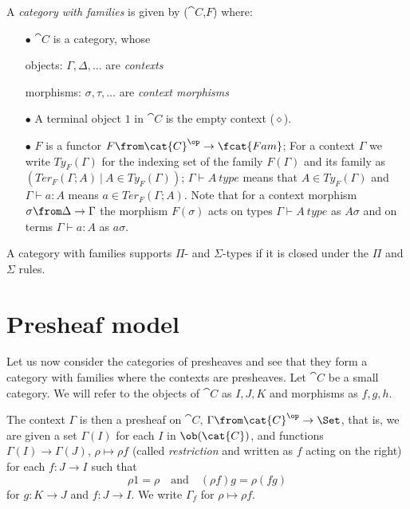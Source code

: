 \begin{definition}
A \emph{category with families} is given by ($\cat{C}$,$F$) where:

\begin{itemize}
  \item[$\bullet$] $\cat{C}$ is a category, whose

    objects: $\Gamma, \Delta, \dots$ are \emph{contexts}

    morphisms:  $\sigma, \tau, \dots$ are \emph{context morphisms}

  \item[$\bullet$] A terminal object $1$ in $\cat{C}$ is the empty context ($\diamond$).

  \item[$\bullet$] $F$ is a functor $F\from \cat{C}^\op \to \fcat{Fam}$; For a
    context $\Gamma$ we write $Ty_F(\Gamma)$ for the indexing set of the family
    $F(\Gamma)$ and its family as $(Ter_F(\Gamma;A)~|~A \in Ty_F(\Gamma))$;
    $\Gamma \vdash A~type$ means that $A \in Ty_F(\Gamma)$ and $\Gamma \vdash a
    : A$ means $a \in Ter_F(\Gamma;A)$. Note that for a context morphism
    $\sigma \from \Delta \to \Gamma$ the morphism $F(\sigma)$ acts on types
    $\Gamma \vdash A~type$ as $A\sigma$ and on terms $\Gamma \vdash a : A$ as
    $a\sigma$.
\end{itemize}
\end{definition}

A category with families supports $\Pi$- and $\Sigma$-types if it is
closed under the $\Pi$ and $\Sigma$ rules.

\section*{Presheaf model}

Let us now consider the categories of presheaves and see that they form a
category with families where the contexts are presheaves.  Let $\cat{C}$ be a
small category. We will refer to the objects of $\cat{C}$  as $I,J,K$ and
morphisms as $f,g,h$.

The context $\Gamma$ is then a presheaf on $\cat{C}$, $\Gamma \from
\cat{C}^\op \to \Set$, that is, we are given a set $\Gamma(I)$ for each
$I$ in $\ob(\cat{C})$, and functions $\Gamma(I) \to \Gamma(J)$, $\rho \mapsto \rho
f$ (called \emph{restriction} and written as $f$ acting on the right) for each
$f: J \to I$ such that
\[
  \rho 1 = \rho \quad \text{and} \quad (\rho f) g = \rho (f g)
\]
for $g: K \to J$ and $f: J \to I$. We write $\Gamma_f$ for $\rho \mapsto \rho
f$.

